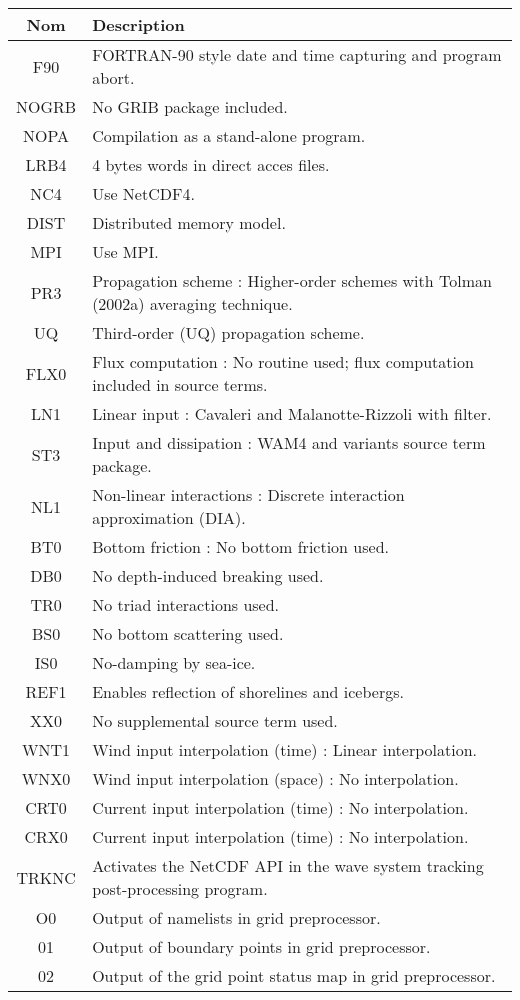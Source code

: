 \documentclass[10pt]{report}
\numberwithin{equation}{section}
\begin{document}
\begin{center}
\begin{tabular}{cl}
\hline
\hline
Nom & Description\\[0pt]
\hline
F90 & FORTRAN-90 style date and time capturing and program abort.\\[0pt]
NOGRB & No GRIB package included.\\[0pt]
NOPA & Compilation as a stand-alone program.\\[0pt]
LRB4 & 4 bytes words in direct acces files.\\[0pt]
NC4 & Use NetCDF4.\\[0pt]
DIST & Distributed memory model.\\[0pt]
MPI & Use MPI.\\[0pt]
PR3 & Propagation scheme : Higher-order schemes with Tolman (2002a) averaging technique.\\[0pt]
UQ & Third-order (UQ) propagation scheme.\\[0pt]
FLX0 & Flux computation : No routine used; flux computation included in source terms.\\[0pt]
LN1 & Linear input : Cavaleri and Malanotte-Rizzoli with filter.\\[0pt]
ST3 & Input and dissipation : WAM4 and variants source term package.\\[0pt]
NL1 & Non-linear interactions : Discrete interaction approximation (DIA).\\[0pt]
BT0 & Bottom friction : No bottom friction used.\\[0pt]
DB0 & No depth-induced breaking used.\\[0pt]
TR0 & No triad interactions used.\\[0pt]
BS0 & No bottom scattering used.\\[0pt]
IS0 & No-damping by sea-ice.\\[0pt]
REF1 & Enables reflection of shorelines and icebergs.\\[0pt]
XX0 & No supplemental source term used.\\[0pt]
WNT1 & Wind input interpolation (time) : Linear interpolation.\\[0pt]
WNX0 & Wind input interpolation (space) : No interpolation.\\[0pt]
CRT0 & Current input interpolation (time) : No interpolation.\\[0pt]
CRX0 & Current input interpolation (time) : No interpolation.\\[0pt]
TRKNC & Activates the NetCDF API in the wave system tracking post-processing program.\\[0pt]
O0 & Output of namelists in grid preprocessor.\\[0pt]
01 & Output of boundary points in grid preprocessor.\\[0pt]
02 & Output of the grid point status map in grid preprocessor.\\[0pt]
\hline
\end{tabular}
\end{center}
\end{document}
